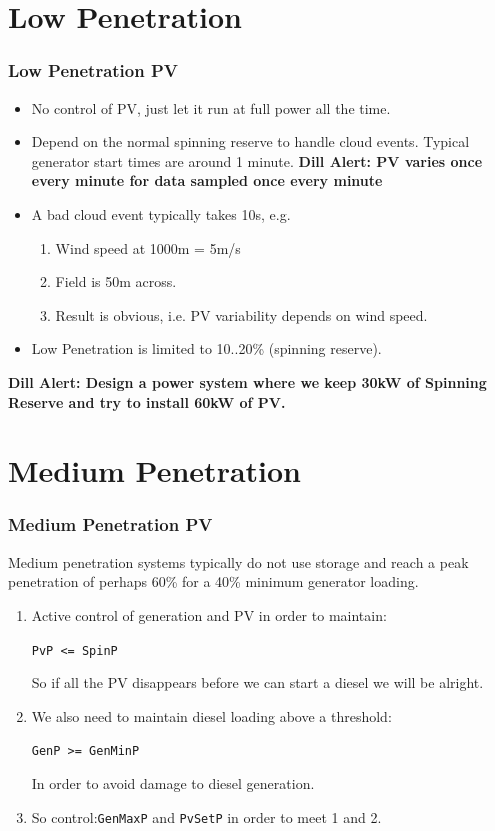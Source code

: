 \documentclass[a4paper,handout]{beamer}
\def\dill#1{\textcolor{RawSienna}{\textbf{Dill Alert: #1}}}
\begin{document}
\section{Low Penetration}
\begin{frame}\frametitle{Low Penetration PV}
  \begin{itemize}
  \item No control of PV, just let it run at full power all the time.
    \pause
  \item Depend on the normal spinning reserve to handle
    cloud events. Typical generator start times are around 1 minute.
    \pause
    \dill{PV varies once every minute for data sampled once 
      every minute}
    \pause
  \item A bad cloud event typically takes 10s, e.g.
    \begin{enumerate}
    \item Wind speed at 1000m = 5m/s
    \item Field is 50m across.
    \item Result is obvious, i.e. PV variability depends on wind speed.
    \end{enumerate}
  \item Low Penetration is limited to 10..20\% (spinning reserve).
  \end{itemize}
  \dill{Design a power system where we keep 30kW of
    Spinning Reserve and try to install 60kW of PV.}
\end{frame}

\section{Medium Penetration}
\begin{frame}\frametitle{Medium Penetration PV}
Medium penetration systems typically do not use storage and
reach a peak penetration of perhaps 60\% for a 40\% minimum generator
loading.
\pause
  \begin{enumerate}
  \item Active control of generation and PV in order to maintain:
    
    \texttt{PvP <= SpinP}

    So if all the PV disappears before we can start a diesel we will
    be alright.
    \pause
  \item We also need to maintain diesel loading above a threshold:
    
    \texttt{GenP >= GenMinP}

    In order to avoid damage to diesel generation.
    \pause
  \item So control:\texttt{GenMaxP} and \texttt{PvSetP} in order to
    meet 1 and 2.
  \end{enumerate}
\end{frame}
\end{document}
